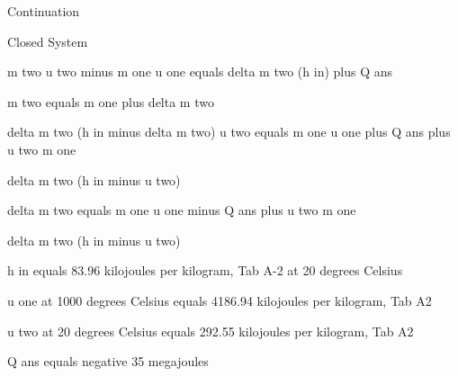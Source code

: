 Continuation

Closed System

m two u two minus m one u one equals delta m two (h in) plus Q ans

m two equals m one plus delta m two

delta m two (h in minus delta m two) u two equals m one u one plus Q ans plus u two m one

delta m two (h in minus u two)

delta m two equals m one u one minus Q ans plus u two m one

delta m two (h in minus u two)

h in equals 83.96 kilojoules per kilogram, Tab A-2 at 20 degrees Celsius

u one at 1000 degrees Celsius equals 4186.94 kilojoules per kilogram, Tab A2

u two at 20 degrees Celsius equals 292.55 kilojoules per kilogram, Tab A2

Q ans equals negative 35 megajoules